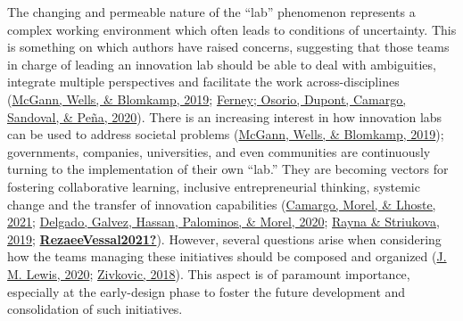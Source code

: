\documentclass[]{elsarticle} %
\begin{document}
The changing and permeable nature of the ``lab'' phenomenon represents a
complex working environment which often leads to conditions of
uncertainty. This is something on which authors have raised concerns,
suggesting that those teams in charge of leading an innovation lab
should be able to deal with ambiguities, integrate multiple perspectives
and facilitate the work across-disciplines
(\protect\hyperlink{ref-McGann2019}{McGann, Wells, \& Blomkamp, 2019};
\protect\hyperlink{ref-Osorio2020}{Ferney; Osorio, Dupont, Camargo,
Sandoval, \& Peña, 2020}). There is an increasing interest in how
innovation labs can be used to address societal problems
(\protect\hyperlink{ref-McGann2019}{McGann, Wells, \& Blomkamp, 2019});
governments, companies, universities, and even communities are
continuously turning to the implementation of their own ``lab.'' They
are becoming vectors for fostering collaborative learning, inclusive
entrepreneurial thinking, systemic change and the transfer of innovation
capabilities (\protect\hyperlink{ref-Camargo2021}{Camargo, Morel, \&
Lhoste, 2021}; \protect\hyperlink{ref-Delgado2020}{Delgado, Galvez,
Hassan, Palominos, \& Morel, 2020};
\protect\hyperlink{ref-Rayna2019}{Rayna \& Striukova, 2019};
\protect\hyperlink{ref-RezaeeVessal2021}{\textbf{RezaeeVessal2021?}}).
However, several questions arise when considering how the teams managing
these initiatives should be composed and organized
(\protect\hyperlink{ref-Lewis2020}{J. M. Lewis, 2020};
\protect\hyperlink{ref-Zivkovic2018}{Zivkovic, 2018}). This aspect is of
paramount importance, especially at the early-design phase to foster the
future development and consolidation of such initiatives.
\end{document}
